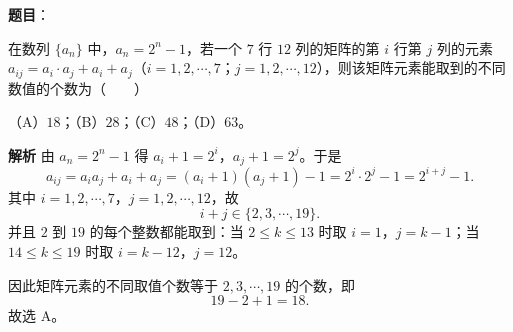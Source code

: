 \begin{answer}

\textbf{题目}：

在数列 $\{a_n\}$ 中，$a_n=2^n-1$，若一个 $7$ 行 $12$ 列的矩阵的第 $i$ 行第 $j$ 列的元素 $a_{ij}=a_i\cdot a_j+a_i+a_j$（$i=1,2,\cdots,7$；$j=1,2,\cdots,12$），则该矩阵元素能取到的不同数值的个数为\mbox{（　　）}

（A）$18$；（B）$28$；（C）$48$；（D）$63$。

\textbf{解析}
由 $a_n=2^n-1$ 得 $a_i+1=2^i$，$a_j+1=2^j$。于是
\nopagebreak[4]
\[a_{ij}=a_ia_j+a_i+a_j
=(a_i+1)(a_j+1)-1
=2^i\cdot2^j-1
=2^{i+j}-1.\]
其中 $i=1,2,\cdots,7$，$j=1,2,\cdots,12$，故
\nopagebreak[4]
\[i+j\in\{2,3,\cdots,19\}.\]
并且 $2$ 到 $19$ 的每个整数都能取到：当 $2\leqslant k\leqslant13$ 时取 $i=1$，$j=k-1$；当 $14\leqslant k\leqslant19$ 时取 $i=k-12$，$j=12$。

因此矩阵元素的不同取值个数等于 $2,3,\cdots,19$ 的个数，即
\nopagebreak[4]
\[19-2+1=18.\]
故选 A。


\end{answer}
